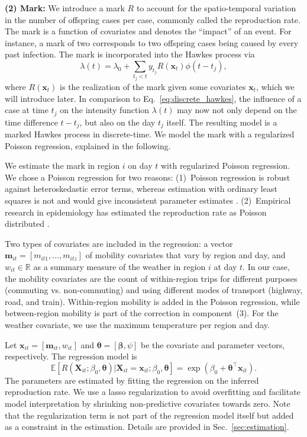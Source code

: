 \documentclass[sigconf, review = false, nonacm = true]{acmart}
\begin{document}
\textbf{(2) Mark:} We introduce a mark $R$ to account for the spatio-temporal variation in the number of offspring cases per case, commonly called the reproduction rate. The mark is a function of covariates and denotes the ``impact'' of an event. For instance, a mark of two corresponds to two offspring cases being caused by every past infection. The mark is incorporated into the Hawkes process via
\begin{equation}
\label{eq:marked_hawles}
    \lambda(t) = \lambda_0 + \sum_{t_j < t} y_{t_j} R(\bm x_t) \phi(t-t_j),
\end{equation}
where $R(\bm x_t)$ is the realization of the mark given some covariates $\bm x_t$, which we will introduce later. In comparison to Eq.~\ref{eq:discrete_hawkes}, the influence of a case at time $t_j$ on the intensity function $\lambda(t)$ may now not only depend on the time difference $t-t_j$, but also on the day $t_j$ itself. The resulting model is a marked Hawkes process in discrete-time. We model the mark with a regularized Poisson regression, explained in the following.

We estimate the mark in region $i$ on day $t$ with regularized Poisson regression. We chose a Poisson regression for two reasons: (1)~Poisson regression is robust against heteroskedastic error terms, whereas estimation with ordinary least squares is not and would give inconsistent parameter estimates \cite{winkelmann_econometric_2008}. (2)~Empirical research in epidemiology has estimated the reproduction rate as Poisson distributed \cite{liu_reproductive_2020, you_estimation_2020}. 

Two types of covariates are included in the regression: a vector $\bm m_{it} = [m_{it1},\ldots,m_{itz}]$ of mobility covariates that vary by region and day, and $w_{it} \in \mathbb R$ as a summary measure of the weather in region $i$ at day $t$. In our case, the mobility covariates are the count of within-region trips for different purposes (commuting vs. non-commuting) and using different modes of transport (highway, road, and train). Within-region mobility is added in the Poisson regression, while between-region mobility is part of the correction in component~(3). For the weather covariate, we use the maximum temperature per region and day.

Let $\bm x_{it} = [\bm m_{it},w_{it}]$ and $\bm \theta = [\bm \beta, \psi]$ be the covariate and parameter vectors, respectively. The regression model is 
\begin{equation}
    \label{eq:poisson}
    \mathbb E[R(\bm X_{it}; \beta_0, \bm \theta)|\bm X_{it} = \bm x_{it}; \beta_0, \bm \theta]
    = 
    \exp( \beta_0 + \bm \theta^\top \bm x_{it}).
\end{equation}
The parameters are estimated by fitting the regression on the inferred reproduction rate. We use a lasso regularization \cite{tibshirani_regression_1996} to avoid overfitting and facilitate model interpretation by shrinking non-predictive covariates towards zero. Note that the regularization term is not part of the regression model itself but added as a constraint in the estimation. Details are provided in Sec.~\ref{sec:estimation}.
\end{document}
